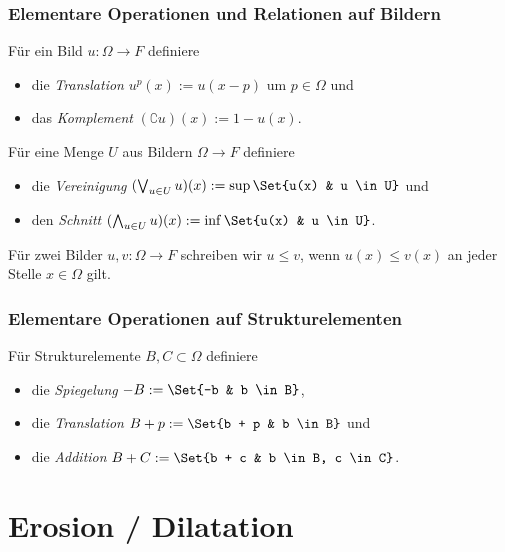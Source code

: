 \documentclass{beamer}
\begin{document}
\begin{frame}
    \frametitle{Elementare Operationen und Relationen auf Bildern}
    \begin{definition}
        Für ein Bild $u: \Omega \to F$ definiere
        \begin{itemize}
            \item \pause
                die \emph{Translation} $u^p(x) := u(x-p)$ um $p \in \Omega$ \pause und
            \item
                das \emph{Komplement} $(\complement u)(x) := 1 - u(x)$.
        \end{itemize}
        \pause
        Für eine Menge $U$ aus Bildern $\Omega \to F$ definiere
        \begin{itemize}
            \item \pause
                die \emph{Vereinigung} $(\bigvee_{u \in U} u)(x) := \sup \Set{u(x) & u \in U}$ \pause und
            \item
                den \emph{Schnitt} $(\bigwedge_{u \in U} u)(x) := \inf \Set{u(x) & u \in U}$.
        \end{itemize}
        \pause
        Für zwei Bilder $u, v: \Omega \to F$ schreiben wir $u \le v$, wenn $u(x) \le v(x)$ an jeder Stelle $x \in \Omega$ gilt.
    \end{definition}
\end{frame}

\begin{frame}
    \frametitle{Elementare Operationen auf Strukturelementen}
    \begin{definition}
        Für Strukturelemente $B, C \subset \Omega$ definiere
        \begin{itemize}
            \item \pause
                die \emph{Spiegelung} $-B := \Set{-b & b \in B}$\pause,
            \item
                die \emph{Translation} $B + p := \Set{b + p & b \in B}$ \pause und
            \item
                die \emph{Addition} $B + C := \Set{b + c & b \in B, c \in C}$.
        \end{itemize}
    \end{definition}
\end{frame}

\section{Erosion / Dilatation}
\end{document}
